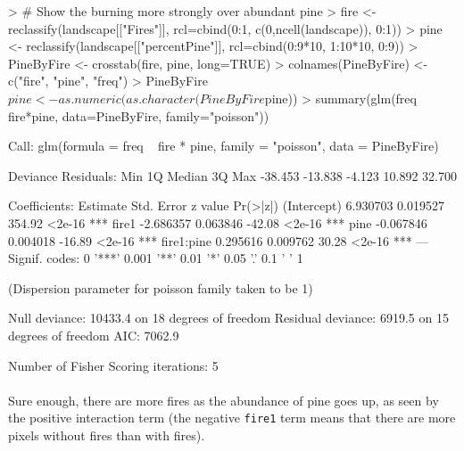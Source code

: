 \documentclass{article}
\begin{document}
\begin{Schunk}
\begin{Sinput}
> # Show the burning more strongly over abundant pine
> fire <- reclassify(landscape[["Fires"]], rcl=cbind(0:1, c(0,ncell(landscape)), 0:1))
> pine <- reclassify(landscape[["percentPine"]], rcl=cbind(0:9*10, 1:10*10, 0:9))
> PineByFire <- crosstab(fire, pine, long=TRUE)
> colnames(PineByFire) <- c("fire", "pine", "freq")
> PineByFire$pine <- as.numeric(as.character(PineByFire$pine))
> summary(glm(freq ~ fire*pine, data=PineByFire, family="poisson"))
\end{Sinput}
\begin{Soutput}
Call:
glm(formula = freq ~ fire * pine, family = "poisson", data = PineByFire)

Deviance Residuals: 
    Min       1Q   Median       3Q      Max  
-38.453  -13.838   -4.123   10.892   32.700  

Coefficients:
             Estimate Std. Error z value Pr(>|z|)    
(Intercept)  6.930703   0.019527  354.92   <2e-16 ***
fire1       -2.686357   0.063846  -42.08   <2e-16 ***
pine        -0.067846   0.004018  -16.89   <2e-16 ***
fire1:pine   0.295616   0.009762   30.28   <2e-16 ***
---
Signif. codes:  0 '***' 0.001 '**' 0.01 '*' 0.05 '.' 0.1 ' ' 1

(Dispersion parameter for poisson family taken to be 1)

    Null deviance: 10433.4  on 18  degrees of freedom
Residual deviance:  6919.5  on 15  degrees of freedom
AIC: 7062.9

Number of Fisher Scoring iterations: 5
\end{Soutput}
\end{Schunk}

\paragraph{}
Sure enough, there are more fires as the abundance of pine goes up, as seen by the positive interaction term (the negative \texttt{fire1} term means that there are more pixels without fires than with fires).
\end{document}
